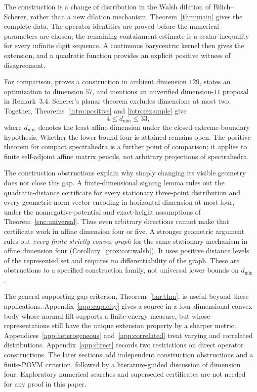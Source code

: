 \documentclass[11pt,letterpaper]{amsart}
\theoremstyle{definition}
\theoremstyle{remark}
\numberwithin{equation}{section}
\begin{document}
The construction is a change of distribution in the Walsh dilation of
Bilich--Scherer, rather than a new dilation mechanism. Theorem~\ref{thm:main}
gives the complete data. The operator identities are proved before the
numerical parameters are chosen; the remaining containment estimate
is a scalar inequality for every infinite digit sequence. A continuous
barycentric kernel then gives the extension, and a quadratic function
provides an explicit positive witness of disagreement.

For comparison, \cite[Corollary 3.3]{BS} proves a construction in
ambient dimension $129$, states an optimization to dimension $57$, and
mentions an unverified dimension-$11$ proposal in Remark~3.4.
Scherer's planar theorem \cite[Theorem 3.8]{planar} excludes dimensions
at most two. Together, Theorems~\ref{intro:positive} and
\ref{intro:example} give
\begin{equation}\label{eq:dimension-range}
                            4\le d_{\min}\le33,
\end{equation}
where $d_{\min}$ denotes the least affine dimension under the
closed-extreme-boundary hypothesis. Whether the lower bound four is attained remains open. The positive theorem for compact spectrahedra
\cite[Theorem 3.7]{spectra} is a further point of comparison; it applies
to finite self-adjoint affine matrix pencils, not arbitrary projections
of spectrahedra.

The construction obstructions explain why simply changing its visible
geometry does not close this gap. A finite-dimensional signing lemma
rules out the quadratic-distance certificate for every stationary
three-point distribution and every geometric-norm vector encoding in
horizontal dimension at most four, under the nonnegative-potential and
exact-height assumptions of Theorem~\ref{enc:universal}. Thus even arbitrary directions cannot
make that certificate work in affine dimension four or five.
A stronger geometric argument rules out \emph{every finite strictly
convex graph} for the same stationary mechanism in affine dimension
four (Corollary~\ref{prox:cor:walsh}). It uses positive distance levels
of the represented set and requires no differentiability of the graph.
These are obstructions to a specified construction family, not universal
lower bounds on $d_{\min}$.

The general supporting-gap criterion, Theorem~\ref{bar:thm}, is useful
beyond these applications. Appendix~\ref{app:capacity} gives a
source in a four-dimensional convex body whose normal lift supports a
finite-energy measure, but whose representations still have the unique extension
property by a sharper metric. Appendices~\ref{app:heterogeneous}
and~\ref{app:correlated} treat varying and correlated distributions.
Appendix~\ref{app:direct} records two restrictions on direct operator
constructions. The later sections add independent construction obstructions and a
finite-POVM criterion, followed by a literature-guided discussion of
dimension four. Exploratory numerical searches and superseded
certificates are not needed for any proof in this paper.
\end{document}
